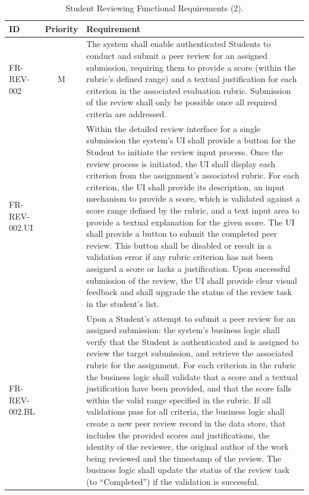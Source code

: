 \begin{table}[h]
    \centering
    \begin{tabular}{|l|c|p{10cm}|}
        \hline
        \textbf{ID} & \textbf{Priority} & \textbf{Requirement} \\
        \hline
        FR-REV-002 & M & The system shall enable authenticated Students to conduct and submit a peer review for an assigned submission, requiring them to provide a score (within the rubric's defined range) and a textual justification for each criterion in the associated evaluation rubric. Submission of the review shall only be possible once all required criteria are addressed. \\
        \quad FR-REV-002.UI &  & \quad Within the detailed review interface for a single submission the system's UI shall provide a button for the Student to initiate the review input process. Once the review process is initiated, the UI shall display each criterion from the assignment's associated rubric. For each criterion, the UI shall provide its description, an input mechanism to provide a score, which is validated against a score range defined by the rubric, and a text input area to provide a textual explanation for the given score. The UI shall provide a button to submit the completed peer review. This button shall be disabled or result in a validation error if any rubric criterion has not been assigned a score or lacks a justification. Upon successful submission of the review, the UI shall provide clear visual feedback and shall upgrade the status of the review task in the student’s list. \\
        \quad FR-REV-002.BL &  & \quad Upon a Student's attempt to submit a peer review for an assigned submission: the system's business logic shall verify that the Student is authenticated and is assigned to review the target submission, and retrieve the associated rubric for the assignment. For each criterion in the rubric the business logic shall validate that a score and a textual justification have been provided, and that the score falls within the valid range specified in the rubric. If all validations pass for all criteria, the business logic shall create a new peer review record in the data store, that includes the provided scores and justifications, the identity of the reviewer, the original author of the work being reviewed and the timestamp of the review. The business logic shall update the status of the review task (to “Completed”) if the validation is successful. \\
        \hline
    \end{tabular}
    \caption{Student Reviewing Functional Requirements (2).}
    \label{tab:StudentReviewingFR2}
\end{table}

